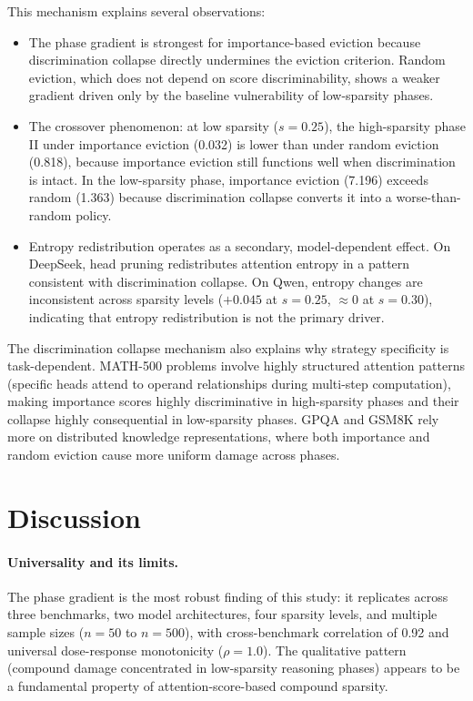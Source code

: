 \documentclass[11pt,a4paper]{article}
\begin{document}
This mechanism explains several observations:
\begin{itemize}
\item The phase gradient is strongest for importance-based eviction because discrimination collapse directly undermines the eviction criterion. Random eviction, which does not depend on score discriminability, shows a weaker gradient driven only by the baseline vulnerability of low-sparsity phases.
\item The crossover phenomenon: at low sparsity ($s{=}0.25$), the high-sparsity phase II under importance eviction (0.032) is lower than under random eviction (0.818), because importance eviction still functions well when discrimination is intact. In the low-sparsity phase, importance eviction (7.196) exceeds random (1.363) because discrimination collapse converts it into a worse-than-random policy.
\item Entropy redistribution operates as a secondary, model-dependent effect. On DeepSeek, head pruning redistributes attention entropy in a pattern consistent with discrimination collapse. On Qwen, entropy changes are inconsistent across sparsity levels ($+0.045$ at $s{=}0.25$, $\approx 0$ at $s{=}0.30$), indicating that entropy redistribution is not the primary driver.
\end{itemize}

The discrimination collapse mechanism also explains why strategy specificity is task-dependent. MATH-500 problems involve highly structured attention patterns (specific heads attend to operand relationships during multi-step computation), making importance scores highly discriminative in high-sparsity phases and their collapse highly consequential in low-sparsity phases. GPQA and GSM8K rely more on distributed knowledge representations, where both importance and random eviction cause more uniform damage across phases.

\section{Discussion}

\paragraph{Universality and its limits.}
The phase gradient is the most robust finding of this study: it replicates across three benchmarks, two model architectures, four sparsity levels, and multiple sample sizes ($n{=}50$ to $n{=}500$), with cross-benchmark correlation of 0.92 and universal dose-response monotonicity ($\rho{=}1.0$). The qualitative pattern (compound damage concentrated in low-sparsity reasoning phases) appears to be a fundamental property of attention-score-based compound sparsity.
\end{document}
